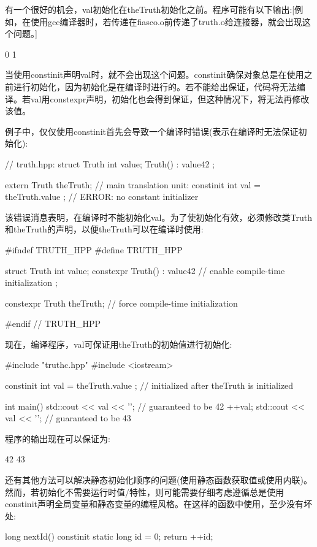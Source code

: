 有一个很好的机会，val初始化在theTruth初始化之前。程序可能有以下输出:[例如，在使用gcc编译器时，若传递在fiasco.o前传递了truth.o给连接器，就会出现这个问题。]

\begin{shell}
0
1
\end{shell}

当使用constinit声明val时，就不会出现这个问题。constinit确保对象总是在使用之前进行初始化，因为初始化是在编译时进行的。若不能给出保证，代码将无法编译。若val用constexpr声明，初始化也会得到保证，但这种情况下，将无法再修改该值。

例子中，仅仅使用constinit首先会导致一个编译时错误(表示在编译时无法保证初始化):

\begin{cpp}
// truth.hpp:
struct Truth {
	int value;
	Truth() : value{42} {
	}
};

extern Truth theTruth;
// main translation unit:
constinit int val = theTruth.value ; // ERROR: no constant initializer
\end{cpp}

该错误消息表明，在编译时不能初始化val。为了使初始化有效，必须修改类Truth和theTruth的声明，以便theTruth可以在编译时使用:


\begin{cpp}
#ifndef TRUTH_HPP
#define TRUTH_HPP

struct Truth {
	int value;
	constexpr Truth() : value{42} { // enable compile-time initialization
	}
};

constexpr Truth theTruth; // force compile-time initialization

#endif // TRUTH_HPP
\end{cpp}

现在，编译程序，val可保证用theTruth的初始值进行初始化:


\begin{cpp}
#include "truthc.hpp"
#include <iostream>

constinit int val = theTruth.value ; // initialized after theTruth is initialized

int main()
{
	std::cout << val << '\n'; // guaranteed to be 42
	++val;
	std::cout << val << '\n'; // guaranteed to be 43
}
\end{cpp}

程序的输出现在可以保证为:

\begin{shell}
42
43
\end{shell}

还有其他方法可以解决静态初始化顺序的问题(使用静态函数获取值或使用内联)。然而，若初始化不需要运行时值/特性，则可能需要仔细考虑遵循总是使用constinit声明全局变量和静态变量的编程风格。在这样的函数中使用，至少没有坏处:

\begin{cpp}
long nextId()
{
	constinit static long id = 0;
	return ++id;
}
\end{cpp}








